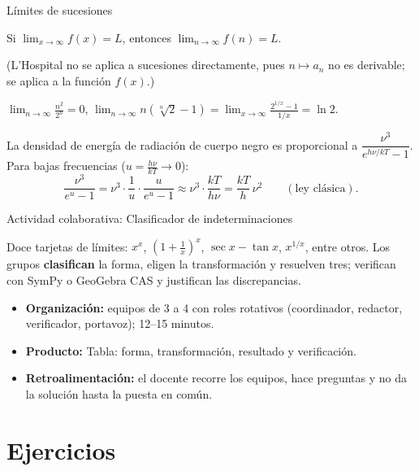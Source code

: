 \documentclass[10pt,aspectratio=169]{beamer}
\begin{document}
\begin{frame}{Límites de sucesiones}
  \begin{teorema}
    Si $\lim_{x\to\infty}f(x)=L$, entonces $\lim_{n\to\infty}f(n)=L$.
  \end{teorema}
  \small (L'Hospital no se aplica a sucesiones directamente, pues $n\mapsto a_n$ no es derivable; se aplica a la función $f(x)$.)
  \normalsize
  \begin{ejemplo}[17]
    $\displaystyle\lim_{n\to\infty}\frac{n^2}{2^n}=0$, \quad $\displaystyle\lim_{n\to\infty}n\left(\sqrt[n]{2}-1\right)=\lim_{x\to\infty}\frac{2^{1/x}-1}{1/x}=\ln2$.
  \end{ejemplo}
  \begin{ejemplo}
    La densidad de energía de radiación de cuerpo negro es proporcional a $\dfrac{\nu^3}{e^{h\nu/kT}-1}$. Para bajas frecuencias ($u=\frac{h\nu}{kT}\to0$):
    \[ \frac{\nu^3}{e^{u}-1}=\nu^3\cdot\frac{1}{u}\cdot\frac{u}{e^u-1}\approx\nu^3\cdot\frac{kT}{h\nu}=\frac{kT}{h}\,\nu^2\qquad(\text{ley clásica}). \]
  \end{ejemplo}
\end{frame}

\begin{frame}{Actividad colaborativa: Clasificador de indeterminaciones}
  \small
  \begin{activa}
    Doce tarjetas de límites: $x^x$, $(1+\frac1x)^x$, $\sec x-\tan x$, $x^{1/x}$, entre otros. Los grupos \textbf{clasifican} la forma, eligen la transformación y resuelven tres; verifican con SymPy o GeoGebra CAS y justifican las discrepancias.
  \end{activa}
  \begin{itemize}
    \item \textbf{Organización:} equipos de 3 a 4 con roles rotativos (coordinador, redactor, verificador, portavoz); 12--15 minutos.
    \item \textbf{Producto:} Tabla: forma, transformación, resultado y verificación.
    \item \textbf{Retroalimentación:} el docente recorre los equipos, hace preguntas y no da la solución hasta la puesta en común.
  \end{itemize}
\end{frame}

\section{Ejercicios}
\end{document}
